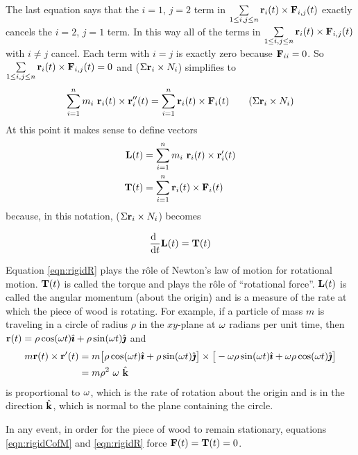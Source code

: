 The last equation says that the $i=1$, $j=2$ term in 
$\sum\limits_{1\le i,j\le n} \mathbf{r}_i(t)\times\mathbf{F}_{i,j}(t)$
exactly cancels the $i=2$, $j=1$ term. 
In this way all of the terms in 
$\sum\limits_{1\le i,j\le n} \mathbf{r}_i(t)\times\mathbf{F}_{i,j}(t)$
with $i\ne j$ cancel. Each term with $i=j$ is exactly zero because
$\mathbf{F}_{ii}=0$.
So $\sum\limits_{1\le i,j\le n} \mathbf{r}_i(t)\times\mathbf{F}_{i,j}(t)=0$
and ($\Sigma \mathbf{r}_i\times N_i$) simplifies to
\begin{equation}
\sum_{i=1}^n m_i\ \vr_i(t)\times\vr''_i(t)
= \sum_{i=1}^n \vr_i(t)\times\vF_i(t)
\tag{$\Sigma \vr_i\times N_i$}\end{equation}
At this point it makes sense to define vectors
\begin{align*}
\mathbf{L}(t)&= \sum_{i=1}^n m_i\ \mathbf{r}_i(t)\times\mathbf{r}'_i(t)\\
\mathbf{T}(t)&=\sum_{i=1}^n \mathbf{r}_i(t)\times\mathbf{F}_i(t)
\end{align*}
because, in this notation, ($\Sigma \mathbf{r}_i\times N_i$) becomes
\begin{impeqn}\label{eqn:rigidR}
\begin{equation*}
\diff{\hfill}{t}\vL(t)=\vT(t)
\end{equation*}
\end{impeqn}
\noindent
Equation \eqref{eqn:rigidR} plays the r\^ole of Newton's law of 
motion for rotational motion. $\mathbf{T}(t)$ is called the torque and 
plays the r\^ole of ``rotational force''. $\mathbf{L}(t)$ is called the 
angular momentum (about the origin) and is a measure of the rate 
at which the piece of wood is rotating. 
For example, if a particle of mass $m$ is traveling in a circle of 
radius $\rho$ in the $xy$-plane at $\omega$ radians per unit time, then $\mathbf{r}(t)=\rho\cos(\omega t)\hat{\pmb{\imath}}+\rho\sin(\omega t)\hat{\pmb{\jmath}}$ and
\begin{align*}
m\mathbf{r}(t)\times\mathbf{r}'(t) 
&= m \big[\rho\cos(\omega t)\hat{\pmb{\imath}}+\rho\sin(\omega t)\hat{\pmb{\jmath}}\big]
\times\big[-\omega\rho\sin(\omega t)\hat{\pmb{\imath}}+\omega\rho\cos(\omega t)\hat{\pmb{\jmath}}\big] \\
&=m \rho^2\ \omega\ \hat{\mathbf{k}}
\end{align*}
is proportional to $\omega$, which is the rate of rotation about the origin
and is in the direction $\hat{\mathbf{k}}$, which is normal to the plane containing
the circle.

In any event, in order for the piece of wood to remain stationary, 
equations \eqref{eqn:rigidCofM} and \eqref{eqn:rigidR} 
force $\mathbf{F}(t)=\mathbf{T}(t)=0$.

